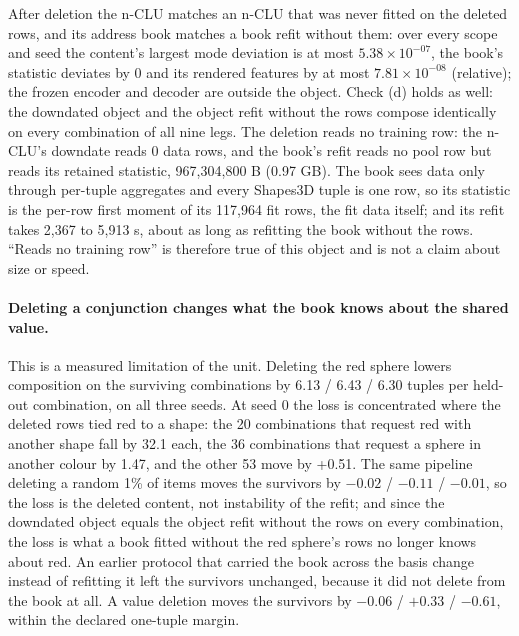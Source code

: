 \documentclass{article} %
\newcommand{\sci}[2]{\ensuremath{#1\times10^{#2}}}
\begin{document}
\noindent After deletion the n-CLU matches an n-CLU that was never fitted on the deleted rows, and its address
book matches a book refit without them: over every scope and seed the content's largest mode
deviation is at most \sci{5.38}{-07}, the book's statistic deviates by 0 and its rendered features by
at most \sci{7.81}{-08} (relative); the frozen encoder and decoder are outside the object. Check (d)
holds as well: the downdated object and the object refit without the rows compose identically on every
combination of all nine legs.
 The deletion reads no training row: the n-CLU's downdate reads 0 data rows, and the %
book's refit reads no pool row but reads its retained statistic, 967,304,800 B (0.97 GB). The book sees %
data only through per-tuple aggregates and every Shapes3D tuple is one row, so its statistic is the
per-row first moment of its 117,964 fit rows, the fit data itself; and its refit takes 2,367 to %
5,913 s, about as long as refitting the book without the rows. ``Reads no training row'' is %
therefore true of this object and is not a claim about size or speed.

\paragraph{Deleting a conjunction changes what the book knows about the shared value.} This is a
measured limitation of the unit. Deleting the red sphere lowers composition on the surviving combinations
by 6.13 / 6.43 / 6.30 tuples per held-out combination, on all three seeds. At seed 0 the loss is concentrated where %
the deleted rows tied red to a shape: the 20 combinations that request red with another shape fall by %
32.1 each, the 36 combinations that request a sphere in another colour by 1.47, and the other 53 move %
by +0.51. The same pipeline deleting a random 1\% of items moves the survivors by $-0.02$ / %
$-0.11$ / $-0.01$, so the loss is the deleted content, not instability of the refit; and since the %
downdated object equals the object refit without the rows on every combination, the loss is what a book
fitted without the red sphere's rows no longer knows about red. An earlier protocol that carried the
book across the basis change instead of refitting it left the survivors unchanged, because it did
not delete from the book at all. A value deletion moves the survivors by $-0.06$ / $+0.33$ / %
$-0.61$, within the declared one-tuple margin. %
\end{document}
